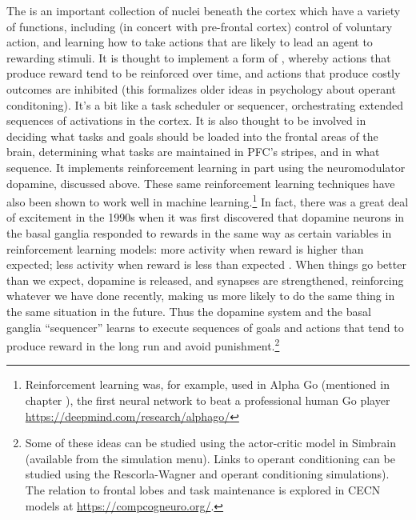  The  is an important collection of nuclei beneath the cortex which have a variety of functions, including (in concert with pre-frontal cortex) control of voluntary action, and learning how to take actions that are likely to lead an agent to rewarding stimuli. It is thought to implement a form of , whereby actions that produce reward tend to be reinforced over time, and actions that produce costly outcomes are inhibited (this formalizes older ideas in psychology about operant conditoning). It's a bit like a task scheduler or sequencer, orchestrating extended sequences of activations in the cortex. It is also thought to be involved in deciding what tasks and goals should be loaded into the frontal areas of the brain, determining what tasks are maintained in PFC's stripes, and in what sequence. It implements reinforcement learning in part using the neuromodulator dopamine, discussed above.  These same reinforcement learning techniques have also been shown to work well in machine learning.\footnote{Reinforcement learning was, for example, used in Alpha Go (mentioned in chapter ), the first neural network to beat a professional human Go player \url{https://deepmind.com/research/alphago/}} In fact, there was a great deal of excitement in the 1990s when it was first discovered that dopamine neurons in the basal ganglia responded to rewards in the same way as certain variables in reinforcement learning models: more activity when reward is higher than expected; less activity when reward is less than expected  \cite{schultz1997neural, niv2009reinforcement}.  When things go better than we expect, dopamine is released, and synapses are strengthened, reinforcing whatever we have done recently, making us more likely to do the same thing in the same situation in the future. Thus the dopamine system and the basal ganglia ``sequencer'' learns to execute sequences of goals and actions that tend to produce reward in the long run and avoid punishment.\footnote{Some of these ideas can be studied using the actor-critic model in Simbrain (available from the simulation menu). Links to operant conditioning can be studied using the Rescorla-Wagner and operant conditioning simulations).  The relation to frontal lobes and task maintenance is explored in CECN models at \url{https://compcogneuro.org/}.}
 
